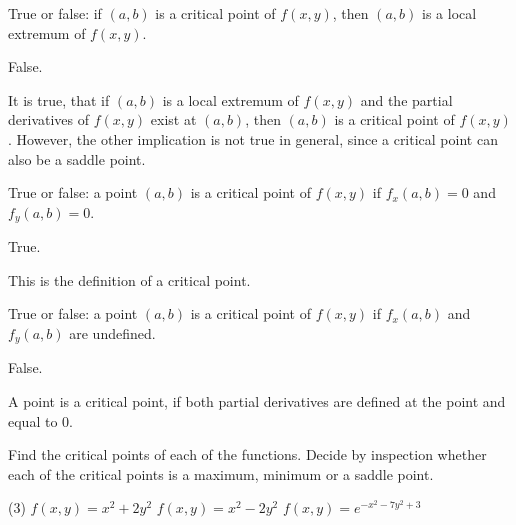 \begin{question}
True or false: if $(a,b)$ is a critical point of $f(x,y)$, then $(a,b)$ is a local extremum of $f(x,y)$.
\end{question}

\begin{solution}
False.

It is true, that if $(a,b)$ is a local extremum of $f(x,y)$ and the partial derivatives of $f(x,y)$ exist at $(a,b)$, then $(a,b)$ is a critical point of $f(x,y)$. However, the other implication is not true in general, since a critical point can also be a saddle point.
\end{solution}

\begin{question}
True or false: a point $(a,b)$ is a critical point of $f(x,y)$ if $f_x(a,b)=0$ and $f_y(a,b) = 0$.
\end{question}

\begin{solution}
True.

This is the definition of a critical point.
\end{solution}

\begin{question}
True or false: a point $(a,b)$ is a critical point of $f(x,y)$ if $f_x(a,b)$ and $f_y(a,b)$ are undefined.
\end{question}

\begin{solution}
False.

A point is a critical point, if both partial derivatives are defined at the point and equal to $0$.
\end{solution}

\begin{question}
Find the critical points of each of the functions. Decide by inspection whether each of the critical points is a maximum, minimum or a saddle point.
\begin{tasks}(3)
\task
$f(x,y) = x^2+2y^2$
\task
$f(x,y) = x^2-2y^2$
\task
$f(x,y) = e^{-x^2-7y^2+3}$
\end{tasks}
\end{question}

